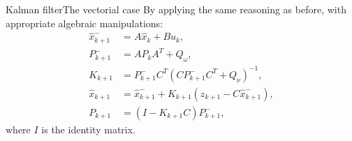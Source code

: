 \begin{frame}{Kalman filter}{The vectorial case}
  By applying the same reasoning as before, with appropriate algebraic manipulations:
  \begin{subequations}
    \begin{align}
      \hat{x}_{k+1}^{-} &= A\hat{x}_k + Bu_k,\label{eq:predictionxvec}\\
      P_{k+1}^{-} &= AP_kA^T + Q_{\omega},\label{eq:predictioncovvec}\\
      K_{k+1} &= P_{k+1}^{-}C^T(CP_{k+1}^{-}C^T + Q_{\nu})^{-1},\label{eq:kalmangainvec}\\
      \hat{x}_{k+1} &= \hat{x}_{k+1}^{-} + K_{k+1}(z_{k+1} - C\hat{x}_{k+1}^{-}),\label{eq:innovxvec}\\
      P_{k+1} &= (I - K_{k+1}C)P_{k+1}^{-},\label{eq:innovcovvec}
    \end{align}
  \end{subequations}
  where $I$ is the identity matrix.
\end{frame}

